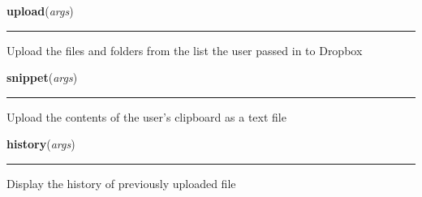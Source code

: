 \hspace{.8\funcindent}\begin{boxedminipage}{\funcwidth}

    \raggedright \textbf{upload}(\textit{args})

    \vspace{-1.5ex}

    \rule{\textwidth}{0.5\fboxrule}
\setlength{\parskip}{2ex}
    Upload the files and folders from the list the user passed in to 
    Dropbox

\setlength{\parskip}{1ex}
    \end{boxedminipage}

    \label{lib:main:snippet}

    \vspace{0.5ex}

\hspace{.8\funcindent}\begin{boxedminipage}{\funcwidth}

    \raggedright \textbf{snippet}(\textit{args})

    \vspace{-1.5ex}

    \rule{\textwidth}{0.5\fboxrule}
\setlength{\parskip}{2ex}
    Upload the contents of the user's clipboard as a text file

\setlength{\parskip}{1ex}
    \end{boxedminipage}

    \label{lib:main:history}

    \vspace{0.5ex}

\hspace{.8\funcindent}\begin{boxedminipage}{\funcwidth}

    \raggedright \textbf{history}(\textit{args})

    \vspace{-1.5ex}

    \rule{\textwidth}{0.5\fboxrule}
\setlength{\parskip}{2ex}
    Display the history of previously uploaded file

\setlength{\parskip}{1ex}
    \end{boxedminipage}

    \label{lib:main:revisit}

